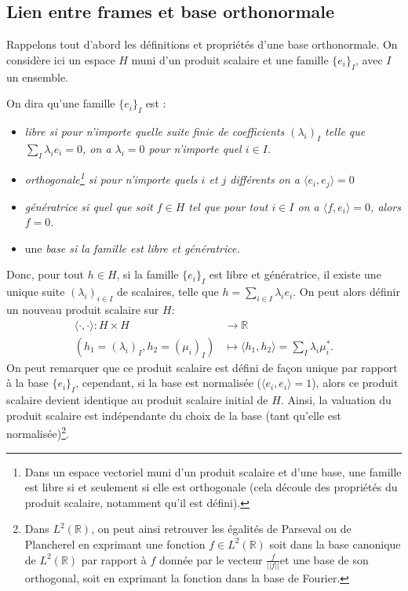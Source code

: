 \subsection{Lien entre frames et base orthonormale}
Rappelons tout d'abord les définitions et propriétés d'une base orthonormale. On considère ici un espace $H$ muni d'un produit scalaire et une famille $\{e_i\}_I$, avec $I$ un ensemble.
\begin{definition}
	On dira qu'une famille $\{e_i\}_I$ est :
	\begin{itemize}
		\item \it{libre} si pour n'importe quelle suite finie de coefficients $(\lambda_i)_I$ telle que $\sum_I \lambda_i e_i = 0$, on a $\lambda_i = 0$ pour n'importe quel $i \in I$.
		\item \it{orthogonale}\footnote{Dans un espace vectoriel muni d'un produit scalaire et d'une base, une famille est libre si et seulement si elle est orthogonale (cela découle des propriétés du produit scalaire, notamment qu'il est défini).} si pour n'importe quels $i$ et $j$ différents on a $\langle e_i, e_j \rangle = 0$
		\item \it{génératrice} si quel que soit $f \in H$ tel que pour tout $i\in I$ on a $\langle f, e_i \rangle = 0$, alors $f =0$.
		\item une \it{base} si la famille est libre et génératrice.
	\end{itemize}
\end{definition}
Donc, pour tout $h \in H$, si la famille $\{e_i\}_I$ est libre et génératrice, il existe une unique suite $(\lambda_i)_{i \in I}$ de scalaires, telle que $ h = \sum_{i \in I} \lambda_i e_i$.
On peut alors définir un nouveau produit scalaire sur $H$: 
\begin{align}
	\langle \cdot, \cdot \rangle :  H \times H &\longrightarrow \mathbb{R} \\
		(h_1= (\lambda_i)_I, h_2 = (\mu_i)_I) &\longmapsto \langle h_1, h_2 \rangle = \sum_I \lambda_i \mu_i^*.
\end{align}
On peut remarquer que ce produit scalaire est défini de façon unique par rapport à la base $\{e_i\}_I$, cependant, si la base est normalisée ($\langle e_i, e_i \rangle =1$), alors ce produit scalaire devient identique au produit scalaire initial de $H$. 
Ainsi, la valuation du produit scalaire est indépendante du choix de la base (tant qu'elle est normalisée)\footnote{Dans $L^2(\mathbb{R})$, on peut ainsi retrouver les égalités de Parseval ou de Plancherel en exprimant une fonction $f\in L^2(\mathbb{R})$ soit dans la base canonique de $L^2(\mathbb{R})$ par rapport à $f$ donnée par le vecteur $\frac{f}{||f||}$et une base de son orthogonal, soit en exprimant la fonction dans la base de Fourier.}.
